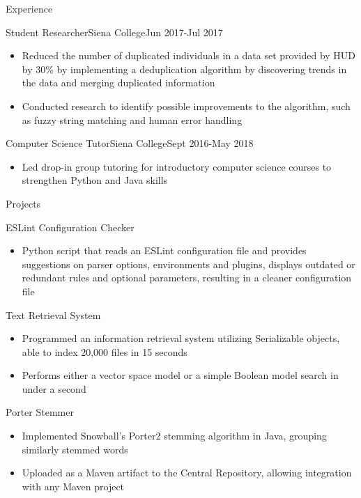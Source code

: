 \documentclass[]{xjavathehutt}
\begin{document}
\begin{cvsection}{Experience}
  \begin{cvsubsection}{Student Researcher}{Siena College}{Jun 2017-Jul 2017}
    \begin{itemize}
      \item{Reduced the number of duplicated individuals in a data set provided by HUD by 30\% by
        implementing a deduplication algorithm by discovering trends in the data and merging
      duplicated information}
      \item{Conducted research to identify possible improvements
        to the algorithm, such as fuzzy string matching and human error handling}
    \end{itemize}
  \end{cvsubsection}

  \begin{cvsubsection}{Computer Science Tutor}{Siena College}{Sept 2016-May 2018}
    \begin{itemize}
      \item{Led drop-in group tutoring for introductory computer science courses to strengthen
        Python and Java skills}
    \end{itemize}
  \end{cvsubsection}
\end{cvsection}


\begin{cvsection}{Projects}
  \begin{cvprojectstart}{ESLint Configuration Checker}
    \begin{itemize}
      \item{Python script that reads an ESLint configuration file and provides suggestions on parser options, environments and plugins, displays outdated or redundant rules and optional parameters, resulting in a cleaner configuration file}
    \end{itemize}
  \end{cvprojectstart}

  \begin{cvproject}{Text Retrieval System}
    \begin{itemize}
      \item{Programmed an information retrieval system utilizing Serializable objects, able to index 20,000 files in 15 seconds}
      \item{Performs either a vector space model or a simple Boolean model search in under a second}
    \end{itemize}
  \end{cvproject}

  \begin{cvproject}{Porter Stemmer}
    \begin{itemize}
      \item{Implemented Snowball's Porter2 stemming algorithm in Java, grouping similarly stemmed words}
      \item{Uploaded as a Maven artifact to the Central Repository, allowing integration with any Maven project}
    \end{itemize}
  \end{cvproject}
\end{cvsection}
\end{document}
